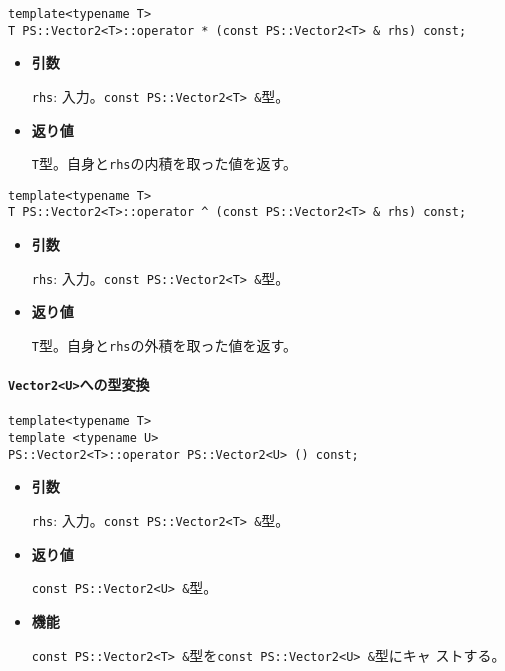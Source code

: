 \begin{screen}
\begin{verbatim}
template<typename T>
T PS::Vector2<T>::operator * (const PS::Vector2<T> & rhs) const;
\end{verbatim}
\end{screen}

\begin{itemize}

\item{{\bf 引数}}

{\tt rhs}: 入力。{\tt const PS::Vector2<T> \&}型。

\item{{\bf 返り値}}

{\tt T}型。自身と{\tt rhs}の内積を取った値を返す。

\end{itemize}

\begin{screen}
\begin{verbatim}
template<typename T>
T PS::Vector2<T>::operator ^ (const PS::Vector2<T> & rhs) const;
\end{verbatim}
\end{screen}

\begin{itemize}

\item{{\bf 引数}}

{\tt rhs}: 入力。{\tt const PS::Vector2<T> \&}型。

\item{{\bf 返り値}}

{\tt T}型。自身と{\tt rhs}の外積を取った値を返す。

\end{itemize}


\paragraph{{\tt Vector2<U>}への型変換}
\mbox{}

\begin{screen}
\begin{verbatim}
template<typename T>
template <typename U>
PS::Vector2<T>::operator PS::Vector2<U> () const;
\end{verbatim}
\end{screen}

\begin{itemize}

\item{{\bf 引数}}

{\tt rhs}: 入力。{\tt const PS::Vector2<T> \&}型。

\item{{\bf 返り値}}

{\tt const PS::Vector2<U> \&}型。

\item{{\bf 機能}}

{\tt const PS::Vector2<T> \&}型を{\tt const PS::Vector2<U> \&}型にキャ
ストする。

\end{itemize}


